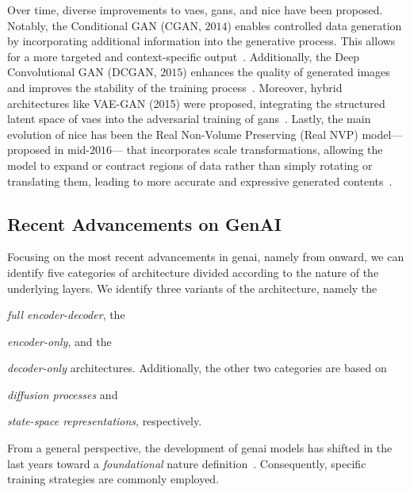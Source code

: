 Over time, diverse improvements to \glspl{vae}, \glspl{gan}, and \gls{nice} have been proposed.
Notably, the Conditional GAN (CGAN, $2014$) enables controlled data generation by incorporating additional information into the generative process. This allows for a more targeted and context-specific output~\cite{mirza2014conditional}.
Additionally, the Deep Convolutional GAN (DCGAN, $2015$) enhances the quality of generated images and improves the stability of the training process~\cite{radford2015unsupervised}.
Moreover, hybrid architectures like VAE-GAN (2015) were proposed, integrating the structured latent space of \glspl{vae} into the adversarial training of \glspl{gan}~\cite{larsen2016autoencoding}.
Lastly, the main evolution of \gls{nice} has been the Real Non-Volume Preserving (Real NVP) model---%
proposed in mid-$2016$---%
that incorporates scale transformations, allowing the model to expand or contract regions of data rather than simply rotating or translating them, leading to more accurate and expressive generated contents~\cite{dinh2016density}.



\subsection{Recent Advancements on GenAI}
\label{subsec:recent_ai}


%
Focusing on the most recent advancements in \gls{genai},
namely from  onward,
we can identify five categories of architecture divided according to the nature of the underlying layers.
We identify three variants of the  architecture, namely the
\begin{enumerate*}[label=(\emph{\roman*})]
    \item \emph{full encoder-decoder}, the 
    \item \emph{encoder-only}, and the
    \item \emph{decoder-only} architectures. 
    Additionally, the other two categories are based on
    \item \emph{diffusion processes} and 
    \item \emph{state-space representations}, respectively.
\end{enumerate*}
From a general perspective, the development of \gls{genai} models has shifted in the last years toward a \emph{foundational} nature definition~\cite{bommasani2021opportunities}.
Consequently, specific training strategies are commonly employed.

